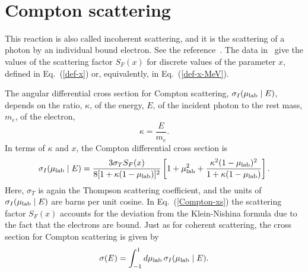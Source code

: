     \\
   \\
   \Input{ \indent  }{$\cdots$}\\
  \\
    \\
    \\
    \\
  \\
  \\
  \\
  \\
  \\
   \Input{ \indent  }{$\cdots$}\\

\section{Compton scattering}\label{Sec:Compton-scattering}
This reaction is also called incoherent scattering, and it is
the scattering of a photon by an individual bound electron.
See the reference~\cite{ENDFB}.
The data in \xendl\ give the values
of the scattering factor $S_F(x)$ for discrete values
of the parameter $x$, defined in Eq.~(\ref{def-x})
or, equivalently, in Eq.~(\ref{def-x-MeV}).  

The angular differential cross section for Compton scattering,
$\sigma_I(\mu_{\text{lab}} \mid E)$,
depends on the ratio, $\kappa$, of the energy, $E$, of the incident photon
to the rest mass, $m_e$, of the electron,
\begin{equation}
  \kappa = \frac{E}{m_e}.
  \label{Compton-relative-E}
\end{equation}
In terms of $\kappa$ and $x$, the Compton differential cross section is
\begin{equation}
  \sigma_I(\mu_{\text{lab}} \mid E) =
    \frac{3 \sigma_T S_F(x)}{ 8[ 1 + \kappa(1 - \mu_{\text{lab}})]^2 }
    \left[
      1 + \mu_{\text{lab}}^2 + \frac{\kappa^2 (1 - \mu_{\text{lab}})^2}{1 + \kappa(1 - \mu_{\text{lab}})}
    \right].
  \label{Compton-xs}
\end{equation}
Here, $\sigma_T$ is again the Thompson scattering coefficient, and the
units of $\sigma_I(\mu_{\text{lab}} \mid E)$ are barns per unit cosine.
In Eq.~(\ref{Compton-xs}) the scattering factor $S_F(x)$ accounts
for the deviation from the Klein-Nishina formula due to the fact
that the electrons are bound.
Just as for coherent scattering, the cross section for Compton
scattering is given by
\begin{equation}
  \sigma( E) = \int_{-1}^1 d\mu_{\text{lab}} \, \sigma_I(\mu_{\text{lab}} \mid E).
  \label{Compton-sigma}
\end{equation}

